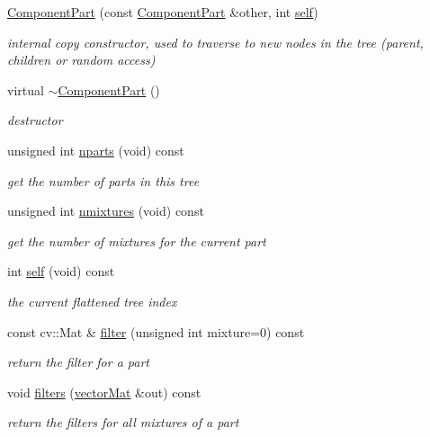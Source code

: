 \begin{DoxyCompactItemize}
\hyperlink{classComponentPart_ac0e19a42768687553d539fef60102310}{\-Component\-Part} (const \hyperlink{classComponentPart}{\-Component\-Part} \&other, int \hyperlink{classComponentPart_abe27079725188a3cb881459a6ba0abc5}{self})
\begin{DoxyCompactList}\small\item\em internal copy constructor, used to traverse to new nodes in the tree (parent, children or random access) \end{DoxyCompactList}\item 
virtual \hyperlink{classComponentPart_adc9d76c5af40cbe00a655361f1b61845}{$\sim$\-Component\-Part} ()
\begin{DoxyCompactList}\small\item\em destructor \end{DoxyCompactList}\item 
unsigned int \hyperlink{classComponentPart_a077a73d9777e77da01176248ca292d23}{nparts} (void) const 
\begin{DoxyCompactList}\small\item\em get the number of parts in this tree \end{DoxyCompactList}\item 
unsigned int \hyperlink{classComponentPart_aba1fa81c2745e5974d72f8403ad48063}{nmixtures} (void) const 
\begin{DoxyCompactList}\small\item\em get the number of mixtures for the current part \end{DoxyCompactList}\item 
int \hyperlink{classComponentPart_abe27079725188a3cb881459a6ba0abc5}{self} (void) const 
\begin{DoxyCompactList}\small\item\em the current flattened tree index \end{DoxyCompactList}\item 
const cv\-::\-Mat \& \hyperlink{classComponentPart_aab10c6684b3ef5e7036800761a564b66}{filter} (unsigned int mixture=0) const 
\begin{DoxyCompactList}\small\item\em return the filter for a part \end{DoxyCompactList}\item 
void \hyperlink{classComponentPart_adcad5d5ac3b60c803755813a6872761b}{filters} (\hyperlink{types_8hpp_a3207a7addcfa415d1c83622febcb1e9b}{vector\-Mat} \&out) const 
\begin{DoxyCompactList}\small\item\em return the filters for all mixtures of a part \end{DoxyCompactList}\item 

\end{DoxyCompactItemize}
